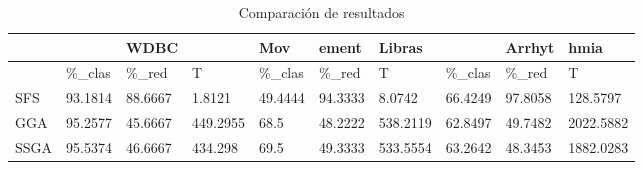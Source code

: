 \begin{table}[H]
	\centering
	\small
	\begin{tabular}{l|lll|lll|lll}
				& 			& WDBC 		&			&	  Mov	& ement 	& Libras	&			& Arrhyt	& hmia		\\ \hline
				& \%\_clas	& \%\_red	& T			& \%\_clas	& \%\_red	& T			& \%\_clas	& \%\_red	& T			\\ \hline
		SFS		& 93.1814	& 88.6667	& 1.8121	& 49.4444	& 94.3333	& 8.0742	& 66.4249	& 97.8058	& 128.5797	\\ \hline
		GGA		& 95.2577	& 45.6667	& 449.2955	& 68.5		& 48.2222	& 538.2119	& 62.8497	& 49.7482	& 2022.5882	\\ \hline
		SSGA	& 95.5374	& 46.6667	& 434.298	& 69.5		& 49.3333	& 533.5554	& 63.2642	& 48.3453	& 1882.0283
		
	\end{tabular}
	\caption{Comparación de resultados}
	\label{Compare}
\end{table}